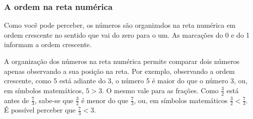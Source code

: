 \subsubsection{A ordem na reta numérica}

\noindent Como você pode perceber, os números são organizados na reta numérica em ordem crescente no sentido que vai do zero para o um. As marcações do 0 e do 1 informam a ordem crescente. 

\begin{center}
\end{center}

A organização dos números na reta numérica permite comparar dois números apenas observando a sua posição na reta. Por exemplo, observando a ordem crescente, como 5 está adiante do 3, o número 5 é maior do que o número 3, ou, em símbolos matemáticos, $5 > 3$. O mesmo vale para as frações. Como $\frac{3}{2}$ está antes de $\frac{7}{3}$, sabe-se que $\frac{3}{2}$ é menor do que $\frac{7}{3}$, ou, em símbolos matemáticos $\frac{3}{2} < \frac{7}{3}$. É possível perceber que $\frac{7}{3} < 3$. 

\begin{center}
\end{center}

